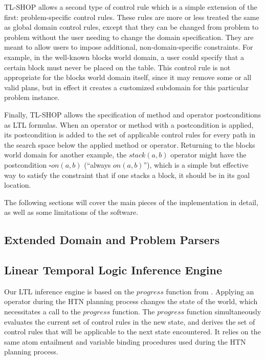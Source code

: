 \documentclass[12pt]{article}
\begin{document}
TL-SHOP allows a second type of control rule which is a simple extension of the 
first: problem-specific control rules. These rules are more or less treated the 
same as global domain control rules, except that they can be changed from 
problem to problem without the user needing to change the domain specification. 
They are meant to allow users to impose additional, non-domain-specific 
constraints. For example, in the well-known blocks world domain, a user could 
specify that a certain block must never be placed on the table. This control 
rule is not appropriate for the blocks world domain itself, since it may remove 
some or all valid plans, but in effect it creates a customized subdomain for 
this particular problem instance.

Finally, TL-SHOP allows the specification of method and operator postconditions 
as LTL formulas. When an operator or method with a postcondition is applied, 
its postcondition is added to the set of applicable control rules for every 
path in the search space below the applied method or operator. Returning to the 
blocks world domain for another example, the $stack(a, b)$ operator might have 
the postcondition $\square on(a, b)$ (``always $on(a, b)$''), which is a simple 
but effective way to satisfy the constraint that if one stacks a block, it 
should be in its goal location.

The following sections will cover the main pieces of the implementation in 
detail, as well as some limitations of the software.

\subsection{Extended Domain and Problem Parsers}


\subsection{Linear Temporal Logic Inference Engine}
Our LTL inference engine is based on the $progress$ function from 
\cite{nau2004apt}. Applying an operator during the HTN planning process changes 
the state of the world, which necessitates a call to the $progress$ function. 
The $progress$ function simultaneously evaluates the current set of control 
rules in the new state, and derives the set of control rules that will be 
applicable to the next state encountered. It relies on the same atom entailment 
and variable binding procedures used during the HTN planning process.
\end{document}
